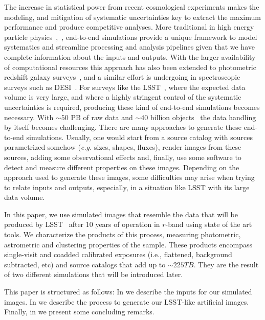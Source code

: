 \documentclass[\docopts]{\docclass}
\begin{document}
The increase in statistical power from recent cosmological experiments makes the modeling, and mitigation of systematic uncertainties key to extract the maximum performance and produce competitive analyses. More traditional in high energy particle physics~\citep{Brun:118715},~\citep{2006JHEP...05..026S}, end-to-end simulations provide a unique framework to
model systematics and streamline processing and analysis pipelines given that we have complete information about the inputs and outputs. With the larger availability of computational resources this approach has also been extended to photometric redshift galaxy surveys~\citep{2016MNRAS.457..786S,2016ApJ...817...25B}, and a similar effort is undergoing in spectroscopic surveys such as DESI~\citep{2016arXiv161100036D}. For surveys like the LSST~\citep{2008arXiv0805.2366I}, where the expected data volume is very large, and where a highly stringent control of the systematic uncertainties is required, producing these
kind of end-to-end simulations becomes necessary. With $\sim 50$ PB of raw data and $\sim 40$ billion objects~\citep{2008arXiv0805.2366I} the data handling by itself becomes challenging. There are many approaches to generate these end-to-end simulations. Usually, one would start from a source catalog with sources parametrized somehow (\textit{e.g.} sizes, shapes, fluxes), render images from these sources, adding some observational effects and, finally, use some software to detect and measure different properties on these images. Depending on the approach used to generate these images, some difficulties may arise when trying to relate inputs and outputs, especially, in a situation like LSST with its large data volume. 

In this paper, we use simulated images that resemble the data that will be produced by
LSST~\citep{2008arXiv0805.2366I} after 10 years of operation in $r$-band using state of the art tools. We characterize the products of this process, measuring photometric, astrometric and clustering properties of the sample. These products encompass single-visit and coadded calibrated exposures (i.e., flattened, background subtracted, etc) and source catalogs that add up to $\sim 225 TB$. They are the result of two different simulations that will be introduced later.

This paper is structured as follows: In  we describe the inputs for our simulated images. In  we describe the process to generate our LSST-like artificial images. Finally, in  we present some concluding remarks.
\end{document}
